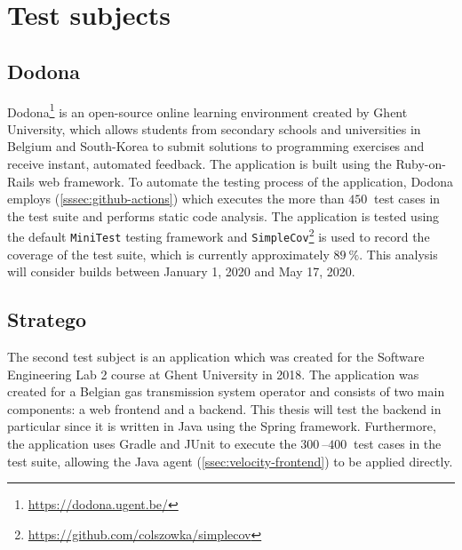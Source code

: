 
\section{Test subjects}

\subsection{Dodona}
Dodona\footnote{\url{https://dodona.ugent.be/}} is an open-source online learning environment created by Ghent University, which allows students from secondary schools and universities in Belgium and South-Korea to submit solutions to programming exercises and receive instant, automated feedback. The application is built using the Ruby-on-Rails web framework. To automate the testing process of the application, Dodona employs \githubactions{} (\cref{sssec:github-actions}) which executes the more than $\SI{450}{}$ test cases in the test suite and performs static code analysis. The application is tested using the default \texttt{MiniTest} testing framework and \texttt{SimpleCov}\footnote{\url{https://github.com/colszowka/simplecov}} is used to record the coverage of the test suite, which is currently approximately $\SI{89}{\percent}$. This analysis will consider builds between January 1, 2020 and May 17, 2020.

\subsection{Stratego}
The second test subject is an application which was created for the Software Engineering Lab 2 course at Ghent University in 2018. The application was created for a Belgian gas transmission system operator and consists of two main components: a web frontend and a backend. This thesis will test the backend in particular since it is written in Java using the Spring framework. Furthermore, the application uses Gradle and JUnit to execute the $\SIrange{300}{400}{}$ test cases in the test suite, allowing the Java agent (\cref{ssec:velocity-frontend}) to be applied directly.